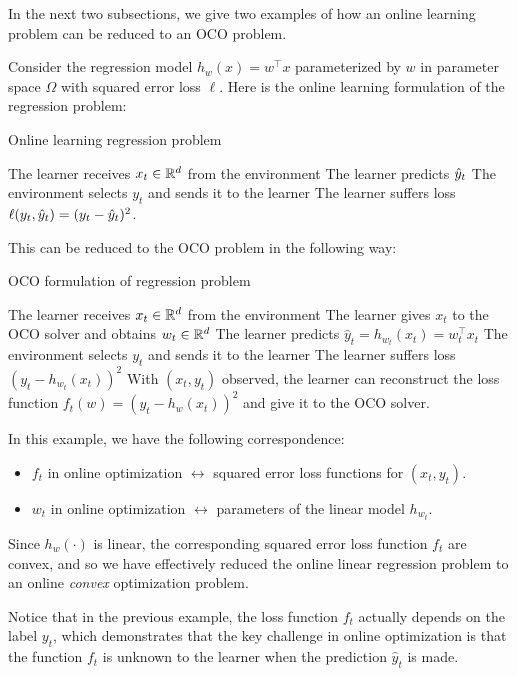 In the next two subsections, we give two examples of how an online learning problem can be reduced to an OCO problem.
    

Consider the regression model $h_w(x) = w^\top x$ parameterized by $w$ in parameter space $\Omega$ with squared error loss $\ell$. Here is the online learning formulation of the regression problem:

\begin{algorithm}
\caption{Online learning regression problem}
 {
The learner receives $x_t \in \mathbb R^d$ from the environment\;
The learner predicts $\hat{y}_t$\;
The environment selects $y_t$ and sends it to the learner\;
The learner suffers loss $\ell(y_t, \hat{y}_t) = (y_t-\hat{y}_t)^2$.
}
\end{algorithm}

This can be reduced to the OCO problem in the following way:

\begin{algorithm}
\caption{OCO formulation of regression problem}
 {
The learner receives $x_t \in \mathbb R^d$ from the environment\;
The learner gives $x_t$ to the OCO solver and obtains $w_t \in \mathbb R^d$\;
The learner predicts $\hat{y}_t = h_{w_t}(x_t) = w_t^\top x_t$\;
The environment selects $y_t$ and sends it to the learner\;
The learner suffers loss $(y_t - h_{w_t}(x_t))^2$\;
With $(x_t, y_t)$ observed, the learner can reconstruct the loss function $f_t(w) = (y_t -h_{w}(x_t))^2$ and give it to the OCO solver.
}
\end{algorithm}

In this example, we have the following correspondence:
\begin{itemize}
\item $f_t$ in online optimization $\leftrightarrow$ squared error loss functions for $(x_t, y_t)$.
\item $w_t$ in online optimization $\leftrightarrow$ parameters of the linear model $h_{w_t}$.
\end{itemize}
    
Since $h_w(\cdot)$ is linear, the corresponding squared error loss function $f_t$ are convex, and so we have effectively reduced the online linear regression problem to an online \emph{convex} optimization problem.
    
Notice that in the previous example, the loss function $f_t$ actually depends on the label $y_t$, which demonstrates that the key challenge in online optimization is that the function $f_t$ is unknown to the learner when the prediction $\hat{y}_t$ is made.
    

